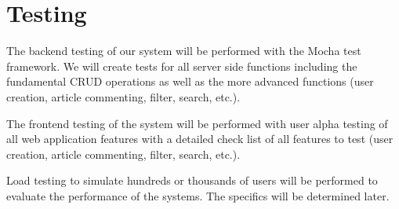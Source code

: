 \documentclass{report}
\begin{document}
\section*{Testing}

The backend testing of our system will be performed with the Mocha test framework. We will create tests for all server side functions including the fundamental CRUD operations as well as the more advanced functions (user creation, article commenting, filter, search, etc.).

The frontend testing of the system will be performed with user alpha testing of all web application features with a detailed check list of all features to test (user creation, article commenting, filter, search, etc.).  

Load testing to simulate hundreds or thousands of users will be performed to evaluate the performance of the systems. The specifics will be determined later.
\end{document}
